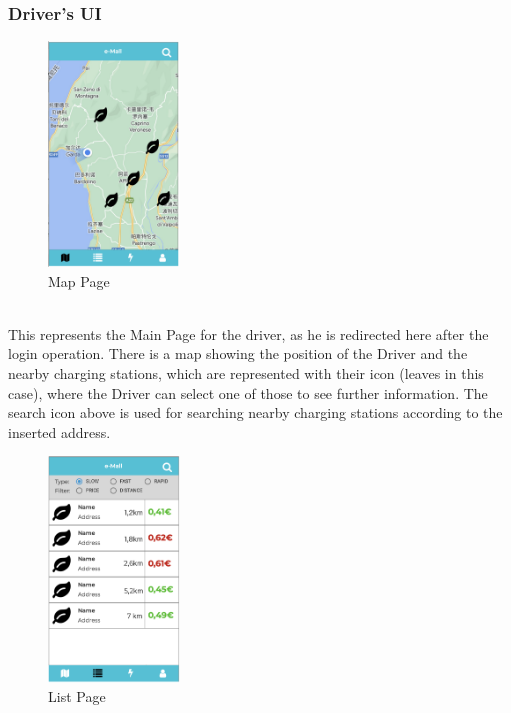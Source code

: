 \documentclass[../main.tex]{subfiles}
\begin{document}
\subsubsection{Driver's UI}
\begin{figure}[!htb]
  \centering
  \begin{minipage}[b]{\textwidth}
  \centering
    \includegraphics[width=35mm]{Mockups/mk_dv_map.png}
    \caption{Map Page}
    \label{fig:class}
  \end{minipage}
\end{figure}
\\
\noindent
This represents the Main Page for the driver, as he is redirected here after the login operation. There is a map showing the position of the Driver and the nearby charging stations, which are represented with their icon (leaves in this case), where the Driver can select one of those to see further information. The search icon above is used for searching nearby charging stations according to the inserted address. 
\begin{figure}[!htb]
    \centering
  \begin{minipage}[b]{\textwidth}
  \centering
    \includegraphics[width=35mm]{Mockups/mk_dv_list.png}
    \caption{List Page}
    \label{fig:class}
  \end{minipage}
\end{figure}\\
\end{document}
